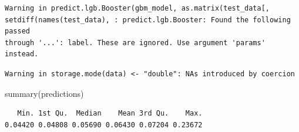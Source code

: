 \documentclass[
  letterpaper,
  DIV=11,
  numbers=noendperiod]{scrartcl}
\newenvironment{Shaded}{\begin{snugshade}}{\end{snugshade}}
\newcommand{\AttributeTok}[1]{\textcolor[rgb]{0.40,0.45,0.13}{#1}}
\newcommand{\DecValTok}[1]{\textcolor[rgb]{0.68,0.00,0.00}{#1}}
\newcommand{\FloatTok}[1]{\textcolor[rgb]{0.68,0.00,0.00}{#1}}
\newcommand{\FunctionTok}[1]{\textcolor[rgb]{0.28,0.35,0.67}{#1}}
\newcommand{\NormalTok}[1]{\textcolor[rgb]{0.00,0.23,0.31}{#1}}
\newcommand{\OtherTok}[1]{\textcolor[rgb]{0.00,0.23,0.31}{#1}}
\newcommand{\SpecialCharTok}[1]{\textcolor[rgb]{0.37,0.37,0.37}{#1}}
\newcommand{\StringTok}[1]{\textcolor[rgb]{0.13,0.47,0.30}{#1}}
\begin{document}
\begin{Shaded}
\end{Shaded}

\begin{verbatim}
Warning in predict.lgb.Booster(gbm_model, as.matrix(test_data[,
setdiff(names(test_data), : predict.lgb.Booster: Found the following passed
through '...': label. These are ignored. Use argument 'params' instead.
\end{verbatim}

\begin{verbatim}
Warning in storage.mode(data) <- "double": NAs introduced by coercion
\end{verbatim}

\begin{Shaded}
\begin{Highlighting}[]
\FunctionTok{summary}\NormalTok{(predictions)}
\end{Highlighting}
\end{Shaded}

\begin{verbatim}
   Min. 1st Qu.  Median    Mean 3rd Qu.    Max. 
0.04420 0.04808 0.05690 0.06430 0.07204 0.23672 
\end{verbatim}

\begin{Shaded}
\end{Shaded}
\end{document}
